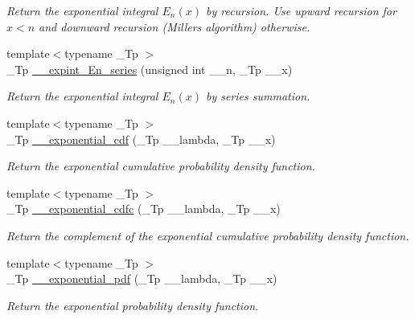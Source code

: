 \begin{DoxyCompactItemize}
\begin{DoxyCompactList}\small\item\em Return the exponential integral $ E_n(x) $ by recursion. Use upward recursion for $ x < n $ and downward recursion (Miller\textquotesingle{}s algorithm) otherwise. \end{DoxyCompactList}\item 
{\footnotesize template$<$typename \+\_\+\+Tp $>$ }\\\+\_\+\+Tp \hyperlink{namespacestd_1_1____detail_a5c51269e411cd82ffec2e63212f76b41}{\+\_\+\+\_\+expint\+\_\+\+En\+\_\+series} (unsigned int \+\_\+\+\_\+n, \+\_\+\+Tp \+\_\+\+\_\+x)
\begin{DoxyCompactList}\small\item\em Return the exponential integral $ E_n(x) $ by series summation. \end{DoxyCompactList}\item 
{\footnotesize template$<$typename \+\_\+\+Tp $>$ }\\\+\_\+\+Tp \hyperlink{namespacestd_1_1____detail_ada7f806f891a02d7825ec9a8862302ad}{\+\_\+\+\_\+exponential\+\_\+cdf} (\+\_\+\+Tp \+\_\+\+\_\+lambda, \+\_\+\+Tp \+\_\+\+\_\+x)
\begin{DoxyCompactList}\small\item\em Return the exponential cumulative probability density function. \end{DoxyCompactList}\item 
{\footnotesize template$<$typename \+\_\+\+Tp $>$ }\\\+\_\+\+Tp \hyperlink{namespacestd_1_1____detail_a4e72483dfbfe8c866974d89f9aeb4b28}{\+\_\+\+\_\+exponential\+\_\+cdfc} (\+\_\+\+Tp \+\_\+\+\_\+lambda, \+\_\+\+Tp \+\_\+\+\_\+x)
\begin{DoxyCompactList}\small\item\em Return the complement of the exponential cumulative probability density function. \end{DoxyCompactList}\item 
{\footnotesize template$<$typename \+\_\+\+Tp $>$ }\\\+\_\+\+Tp \hyperlink{namespacestd_1_1____detail_add35fd0c4c00f412c0fab7b6018ce2cd}{\+\_\+\+\_\+exponential\+\_\+pdf} (\+\_\+\+Tp \+\_\+\+\_\+lambda, \+\_\+\+Tp \+\_\+\+\_\+x)
\begin{DoxyCompactList}\small\item\em Return the exponential probability density function. \end{DoxyCompactList}\item 

\end{DoxyCompactItemize}
